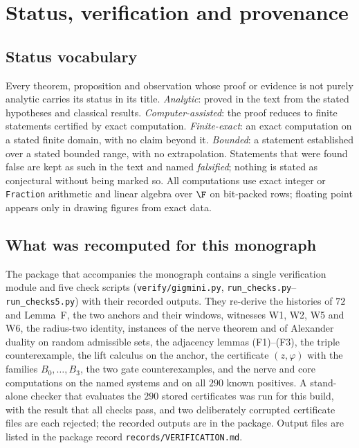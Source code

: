 \appendix

\chapter{Status, verification and provenance}\label{app:status}

\section{Status vocabulary}
Every theorem, proposition and observation whose proof or evidence is not purely analytic carries its status in its title. \emph{Analytic}: proved in the text from the stated hypotheses and classical results. \emph{Computer-assisted}: the proof reduces to finite statements certified by exact computation. \emph{Finite-exact}: an exact computation on a stated finite domain, with no claim beyond it. \emph{Bounded}: a statement established over a stated bounded range, with no extrapolation. Statements that were found false are kept as such in the text and named \emph{falsified}; nothing is stated as conjectural without being marked so. All computations use exact integer or \texttt{Fraction} arithmetic and linear algebra over $\F$ on bit-packed rows; floating point appears only in drawing figures from exact data.

\section{What was recomputed for this monograph}
The package that accompanies the monograph contains a single verification module and five check scripts (\texttt{verify/gigmini.py}, \texttt{run\_checks.py}--\texttt{run\_checks5.py}) with their recorded outputs. They re-derive the histories of $72$ and Lemma~F, the two anchors and their windows, witnesses W1, W2, W5 and W6, the radius-two identity, instances of the nerve theorem and of Alexander duality on random admissible sets, the adjacency lemmas (F1)--(F3), the triple counterexample, the lift calculus on the anchor, the certificate $(z,\varphi)$ with the families $B_0,\dots,B_3$, the two gate counterexamples, and the nerve and core computations on the named systems and on all $290$ known positives. A stand-alone checker that evaluates the $290$ stored certificates was run for this build, with the result that all checks pass, and two deliberately corrupted certificate files are each rejected; the recorded outputs are in the package. Output files are listed in the package record \texttt{records/VERIFICATION.md}.


